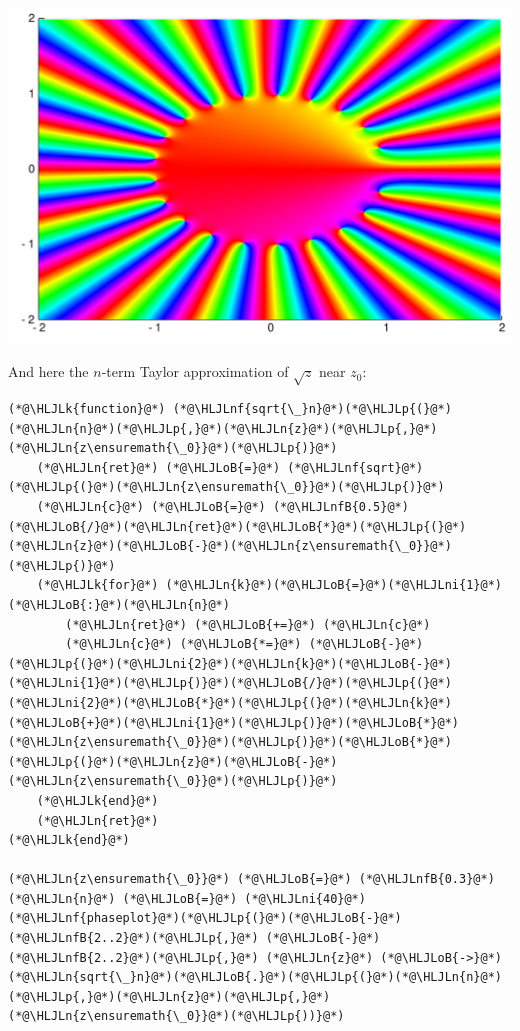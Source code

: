 \documentclass[12pt,a4paper]{article}
\newcommand{\HLJLk}[1]{\textcolor[RGB]{148,91,176}{\textbf{#1}}}
\newcommand{\HLJLn}[1]{#1}
\newcommand{\HLJLnf}[1]{\textcolor[RGB]{66,102,213}{#1}}
\newcommand{\HLJLnfB}[1]{\textcolor[RGB]{59,151,46}{#1}}
\newcommand{\HLJLni}[1]{\textcolor[RGB]{59,151,46}{#1}}
\newcommand{\HLJLoB}[1]{\textcolor[RGB]{102,102,102}{\textbf{#1}}}
\newcommand{\HLJLp}[1]{#1}
\begin{document}
\includegraphics[width=\linewidth]{figures/Lecture2_6_1.pdf}

And here the $n$-term Taylor approximation of $\sqrt z$ near $z_0$:


\begin{lstlisting}
(*@\HLJLk{function}@*) (*@\HLJLnf{sqrt{\_}n}@*)(*@\HLJLp{(}@*)(*@\HLJLn{n}@*)(*@\HLJLp{,}@*)(*@\HLJLn{z}@*)(*@\HLJLp{,}@*)(*@\HLJLn{z\ensuremath{\_0}}@*)(*@\HLJLp{)}@*) 
    (*@\HLJLn{ret}@*) (*@\HLJLoB{=}@*) (*@\HLJLnf{sqrt}@*)(*@\HLJLp{(}@*)(*@\HLJLn{z\ensuremath{\_0}}@*)(*@\HLJLp{)}@*)
    (*@\HLJLn{c}@*) (*@\HLJLoB{=}@*) (*@\HLJLnfB{0.5}@*)(*@\HLJLoB{/}@*)(*@\HLJLn{ret}@*)(*@\HLJLoB{*}@*)(*@\HLJLp{(}@*)(*@\HLJLn{z}@*)(*@\HLJLoB{-}@*)(*@\HLJLn{z\ensuremath{\_0}}@*)(*@\HLJLp{)}@*)
    (*@\HLJLk{for}@*) (*@\HLJLn{k}@*)(*@\HLJLoB{=}@*)(*@\HLJLni{1}@*)(*@\HLJLoB{:}@*)(*@\HLJLn{n}@*)
        (*@\HLJLn{ret}@*) (*@\HLJLoB{+=}@*) (*@\HLJLn{c}@*)
        (*@\HLJLn{c}@*) (*@\HLJLoB{*=}@*) (*@\HLJLoB{-}@*)(*@\HLJLp{(}@*)(*@\HLJLni{2}@*)(*@\HLJLn{k}@*)(*@\HLJLoB{-}@*)(*@\HLJLni{1}@*)(*@\HLJLp{)}@*)(*@\HLJLoB{/}@*)(*@\HLJLp{(}@*)(*@\HLJLni{2}@*)(*@\HLJLoB{*}@*)(*@\HLJLp{(}@*)(*@\HLJLn{k}@*)(*@\HLJLoB{+}@*)(*@\HLJLni{1}@*)(*@\HLJLp{)}@*)(*@\HLJLoB{*}@*)(*@\HLJLn{z\ensuremath{\_0}}@*)(*@\HLJLp{)}@*)(*@\HLJLoB{*}@*)(*@\HLJLp{(}@*)(*@\HLJLn{z}@*)(*@\HLJLoB{-}@*)(*@\HLJLn{z\ensuremath{\_0}}@*)(*@\HLJLp{)}@*)
    (*@\HLJLk{end}@*)
    (*@\HLJLn{ret}@*)
(*@\HLJLk{end}@*)

(*@\HLJLn{z\ensuremath{\_0}}@*) (*@\HLJLoB{=}@*) (*@\HLJLnfB{0.3}@*)
(*@\HLJLn{n}@*) (*@\HLJLoB{=}@*) (*@\HLJLni{40}@*)
(*@\HLJLnf{phaseplot}@*)(*@\HLJLp{(}@*)(*@\HLJLoB{-}@*)(*@\HLJLnfB{2..2}@*)(*@\HLJLp{,}@*) (*@\HLJLoB{-}@*)(*@\HLJLnfB{2..2}@*)(*@\HLJLp{,}@*) (*@\HLJLn{z}@*) (*@\HLJLoB{->}@*) (*@\HLJLn{sqrt{\_}n}@*)(*@\HLJLoB{.}@*)(*@\HLJLp{(}@*)(*@\HLJLn{n}@*)(*@\HLJLp{,}@*)(*@\HLJLn{z}@*)(*@\HLJLp{,}@*)(*@\HLJLn{z\ensuremath{\_0}}@*)(*@\HLJLp{))}@*)
\end{lstlisting}
\end{document}
